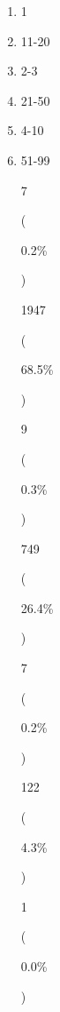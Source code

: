 \documentclass[
]{book}
\begin{document}
\begin{enumerate}
  (

  0.3\%

  )

  6

  :

  4

  (

  0.1\%

  )

  2886
  (99.2\%)

  24
  (0.8\%)

  9

  totcompa
  {[}character{]}

  \begin{enumerate}
  \def\labelenumii{\arabic{enumii}.}
  \item
    \begin{quote}
    =100
    \end{quote}
  \end{enumerate}
\item
  1
\item
  11-20
\item
  2-3
\item
  21-50
\item
  4-10
\item
  51-99

  7

  (

  0.2\%

  )

  1947

  (

  68.5\%

  )

  9

  (

  0.3\%

  )

  749

  (

  26.4\%

  )

  7

  (

  0.2\%

  )

  122

  (

  4.3\%

  )

  1

  (

  0.0\%

  )


\end{enumerate}
\end{document}
